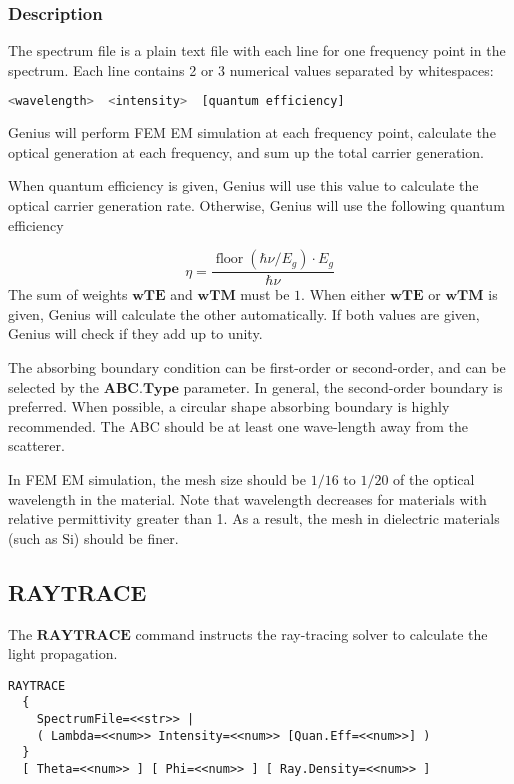 \documentclass[oneside,12pt]{cgd_book}
\begin{document}
\subsubsection{Description}
The spectrum file is a plain text file with each line for one frequency point in the spectrum. Each line
          contains 2 or 3 numerical values separated by whitespaces:
\par
\begin{lstlisting}[language=sh]
<wavelength>  <intensity>  [quantum efficiency]
\end{lstlisting}
Genius will perform FEM EM simulation at each frequency point, calculate the optical generation at each
          frequency, and sum up the total carrier generation.
\par
When quantum efficiency is given, Genius will use this value to calculate the optical carrier generation
          rate. Otherwise, Genius will use the following quantum efficiency
\par
\begin{equation}
\eta = \frac {\mathop{floor}\nolimits (\hbar \nu / E_g ) \cdot E_g } {\hbar \nu}
\end{equation}
The sum of weights $\mathbf{wTE}$ and $\mathbf{wTM}$ must be $1$. When either
$\mathbf{wTE}$ or $\mathbf{wTM}$ is given, Genius
          will calculate the other automatically. If both values are given, Genius will check if they add up to
          unity.
\par
{}The absorbing boundary condition can be first-order or second-order, and can be selected by the
$\mathbf{ABC.Type}$ parameter. In general, the second-order boundary is preferred. When
            possible, a circular shape absorbing boundary is highly recommended. The ABC should be at least one
            wave-length away from the scatterer.
\par
\par
{}In FEM EM simulation, the mesh size should be
$1/16$ to $1/20$ of the optical wavelength in the material. Note that wavelength decreases for
            materials with relative permittivity greater than 1. As a result, the mesh in dielectric materials (such as
            Si) should be finer.
\par
\par
\par
\subsection{RAYTRACE}
The $\mathbf{RAYTRACE}$
command instructs the ray-tracing solver to calculate the light
        propagation.
\par
\begin{lstlisting}[style=GeniusCmd]
RAYTRACE
  {
    SpectrumFile=<<str>> |
    ( Lambda=<<num>> Intensity=<<num>> [Quan.Eff=<<num>>] )
  }
  [ Theta=<<num>> ] [ Phi=<<num>> ] [ Ray.Density=<<num>> ]
\end{lstlisting}
\end{document}
